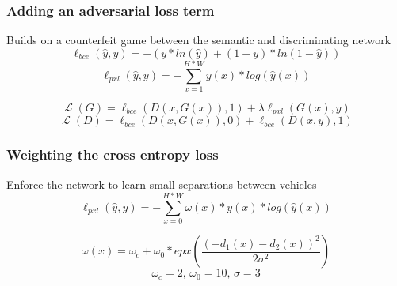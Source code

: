 \documentclass[aspectratio=1610]{beamer}
\DeclareMathOperator{\Lagr}{\mathcal{L}}
\begin{document}
\begin{frame}
  \frametitle{\hfill Adding an adversarial loss term}
	  \begin{block}{Builds on a counterfeit game between the semantic and discriminating network}
	  \begin{equation*}
\ell_{bce}(\hat{y}, y)=-(y*ln(\hat{y})+(1-y)*ln(1-\hat{y}))
\end{equation*}
	  \begin{equation*}\label{eq:mce}
	\ell_{pxl}(\hat{y}, y) = - \sum_{x=1}^{H*W}y(x)*log(\hat{y}(x))
	\end{equation*}

\begin{equation*}
\Lagr(G) =\ell_{bce}(D(x,G(x)), 1) + \lambda\ell_{pxl}(G(x),y)
\end{equation*}
\begin{equation*}
\Lagr(D) =\ell_{bce}(D(x,G(x)), 0) + \ell_{bce}(D(x,y), 1)
\end{equation*}
  \end{block}
\end{frame}



\begin{frame}
  \frametitle{\hfill Weighting the cross entropy loss}
	  \begin{block}{Enforce the network to learn small separations between vehicles}
	  \begin{equation*}\label{eq:mce}
	\ell_{pxl}(\hat{y}, y) = - \sum_{x=0}^{H*W}\omega(x)*y(x)*log(\hat{y}(x))
	\end{equation*}

\begin{equation*}
\omega(x)=\omega_c+\omega_0*epx(\frac{(-d_1(x)-d_2(x))^{2}}{2\sigma^2})
\end{equation*}
\begin{equation*}
\omega_c=2\textit{, }\omega_0=10\textit{, }\sigma=3
\end{equation*}
  \end{block}
\end{frame}
\end{document}
